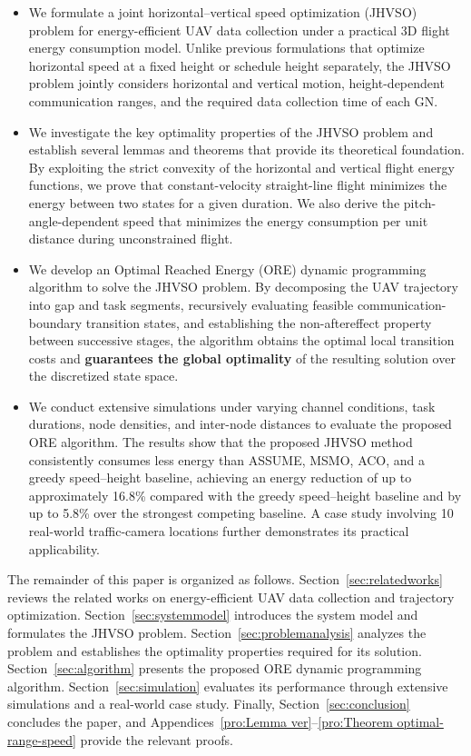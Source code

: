 \begin{itemize}

\item
We formulate a joint horizontal--vertical speed optimization (JHVSO) problem for energy-efficient UAV data collection under a practical 3D flight energy consumption model.
Unlike previous formulations that optimize horizontal speed at a fixed height or schedule height separately, the JHVSO problem jointly considers horizontal and vertical motion, height-dependent communication ranges, and the required data collection time of each GN.

\item
We investigate the key optimality properties of the JHVSO problem and establish several lemmas and theorems that provide its theoretical foundation.
By exploiting the strict convexity of the horizontal and vertical flight energy functions, we prove that constant-velocity straight-line flight minimizes the energy between two states for a given duration.
We also derive the pitch-angle-dependent speed that minimizes the energy consumption per unit distance during unconstrained flight.

\item
We develop an Optimal Reached Energy (ORE) dynamic programming algorithm to solve the JHVSO problem.
By decomposing the UAV trajectory into gap and task segments, recursively evaluating feasible communication-boundary transition states, and establishing the non-aftereffect property between successive stages, the algorithm obtains the optimal local transition costs and \textbf{guarantees the global optimality} of the resulting solution over the discretized state space.

\item
We conduct extensive simulations under varying channel conditions, task durations, node densities, and inter-node distances to evaluate the proposed ORE algorithm.
The results show that the proposed JHVSO method consistently consumes less energy than ASSUME, MSMO, ACO, and a greedy speed--height baseline, achieving an energy reduction of up to approximately 16.8\% compared with the greedy speed--height baseline and by up to 5.8\% over the strongest competing baseline.
A case study involving 10 real-world traffic-camera locations further demonstrates its practical applicability.

\end{itemize}  

The remainder of this paper is organized as follows.
Section~\ref{sec:relatedworks} reviews the related works on energy-efficient UAV data collection and trajectory optimization.
Section~\ref{sec:systemmodel} introduces the system model and formulates the JHVSO problem.
Section~\ref{sec:problemanalysis} analyzes the problem and establishes the optimality properties required for its solution.
Section~\ref{sec:algorithm} presents the proposed ORE dynamic programming algorithm.
Section~\ref{sec:simulation} evaluates its performance through extensive simulations and a real-world case study.
Finally, Section~\ref{sec:conclusion} concludes the paper, and Appendices~\ref{pro:Lemma ver}--\ref{pro:Theorem optimal-range-speed} provide the relevant proofs.


